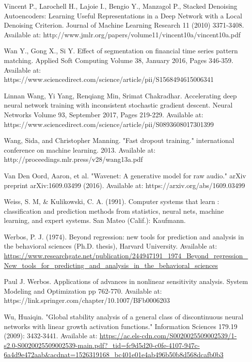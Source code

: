 \documentclass[a4paper,latin]{paper}
\begin{document}
\begin{thebibliography}{bibliography}
Vincent P., Larochell H., Lajoie I., Bengio Y., Manzagol P., Stacked Denoising Autoencoders: Learning Useful Representations in
a Deep Network with a Local Denoising Criterion. Journal of Machine Learning Research 11 (2010) 
3371-3408. Available at: http://www.jmlr.org/papers/volume11/vincent10a/vincent10a.pdf

Wan Y., Gong X., Si Y. Effect of segmentation on financial time series pattern 
matching. Applied Soft Computing Volume 38, January 2016, Pages 346-359. 
Available at: https://www.sciencedirect.com/science/article/pii/S1568494615006341

Linnan Wang,  Yi Yang, Renqiang Min, Srimat Chakradhar. Accelerating deep neural network training with 
inconsistent stochastic gradient descent. Neural Networks
Volume 93, September 2017, Pages 219-229. Available at: https://www.sciencedirect.com/science/article/pii/S0893608017301399

Wang, Sida, and Christopher Manning. "Fast dropout training." international conference on machine learning. 2013.
Available at: http://proceedings.mlr.press/v28/wang13a.pdf

Van Den Oord, Aaron, et al. "Wavenet: A generative model for raw audio." arXiv preprint arXiv:1609.03499 (2016).
Available at: https://arxiv.org/abs/1609.03499

Weiss, S. M, \& Kulikowski, C. A. (1991). Computer systems that learn : classification and prediction methods from statistics, neural nets, machine learning, and expert systems. San Mateo (Calif.): Kaufmann.

Werbos, P. J. (1974). Beyond regression: new tools for prediction and analysis in the behavioral sciences (Ph.D. thesis), Harvard 
University. Available at: \url{https://www.researchgate.net/publication/244947191_1974_Beyond_regression_New_tools_for_predicting_and_analysis_in_the_behavioral_sciences}

Paul J. Werbos. Applications of advances in nonlinear sensitivity analysis. 
System Modeling and Optimization pp 762-770. Available at: https://link.springer.com/chapter/10.1007/BFb0006203

Wu, Huaiqin. "Global stability analysis of a general class of discontinuous neural networks with linear growth activation functions." Information Sciences 179.19 (2009): 3432-3441.
Available at: \url{https://ac.els-cdn.com/S0020025509002539/1-s2.0-S0020025509002539-main.pdf?_tid=fc9d5d20-c0fe-4107-947c-6a4d9e472aab&acdnat=1526319168_bc401e01e4ab496b50b8d568dcafb0b3}


\end{thebibliography}
\end{document}
